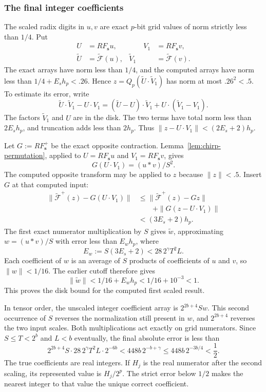 \subsubsection{The final integer coefficients}

The scaled radix digits in $u,v$ are exact $p$-bit grid values of norm
strictly less than $1/4$.  Put
\[
 \begin{aligned}
 U&=RF_{\boldsymbol s}u,&\qquad V_1&=RF_{\boldsymbol s}v,\\
 \widetilde U&=\widetilde{\mathscr F}(u),&
 \widetilde V_1&=\widetilde{\mathscr F}(v).
 \end{aligned}
\]
The exact arrays have norm less than $1/4$, and the computed arrays
have norm less than $1/4+E_sh_p<.26$.  Hence
$z=Q_p(\widetilde U\cdot\widetilde V_1)$ has norm at most
$.26^2<.5$.  To estimate its error, write
\[
 \widetilde U\cdot\widetilde V_1-U\cdot V_1
 =(\widetilde U-U)\cdot\widetilde V_1
       +U\cdot(\widetilde V_1-V_1).
\]
The factors $\widetilde V_1$ and $U$ are in the disk.  The two terms
have total norm less than $2E_sh_p$, and truncation adds less than $2h_p$.
Thus $\|z-U\cdot V_1\|<(2E_s+2)h_p$.

Let $G:=RF_{\boldsymbol s}^+$ be the exact opposite contraction.
Lemma~\ref{lem:chirp-permutation}, applied to
$U=RF_{\boldsymbol s}u$ and $V_1=RF_{\boldsymbol s}v$, gives
\[
 G(U\cdot V_1)=(u*v)/S^2.
\]
The computed opposite transform may be applied to $z$ because
$\|z\|<.5$. Insert $G$ at that computed input:
\[
 \begin{aligned}
 \|\widetilde{\mathscr F}^{+}(z)-G(U\cdot V_1)\|
 &\le \|\widetilde{\mathscr F}^{+}(z)-Gz\|\\
 &\qquad+\|G(z-U\cdot V_1)\|\\
 &<(3E_s+2)h_p.
 \end{aligned}
\]
The first exact numerator multiplication by $S$ gives
$\widetilde w$, approximating $w=(u*v)/S$ with error less than
$E_wh_p$, where
\[
 E_w:=S(3E_s+2)<28\,2^\gamma T^2L.
\]
Each coefficient of $w$ is an average of $S$ products of coefficients
of $u$ and $v$, so $\|w\|<1/16$.  The earlier cutoff therefore gives
\[
 \|\widetilde w\|<1/16+E_wh_p<1/16+10^{-3}<1.
\]
This proves the disk bound for the computed first scaled result.

In tensor order, the unscaled integer coefficient array is
$2^{2b+4}S w$.  This second occurrence of $S$ reverses the
normalization still present in $w$, and $2^{2b+4}$ reverses the two
input scales.  Both multiplications act exactly on grid numerators.
Since $S\le T<2^b$ and $L<b$ eventually, the final absolute error is less than
\begin{equation}\label{eq:final-error}
 2^{2b+4}S\cdot28\,2^\gamma T^2L\cdot2^{-6b}
 <448b\,2^{-b+\gamma}
 \le448b\,2^{-3b/4}<\frac12.
\end{equation}
The true coefficients are real integers.  If $H_j$ is the real
numerator after the second scaling, its represented value is
$H_j/2^p$.  The strict error below $1/2$ makes the nearest integer to
that value the unique correct coefficient.


